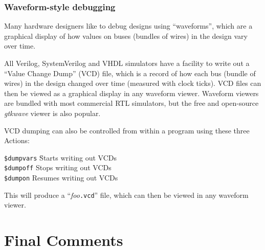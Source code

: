 
\begin{frame}[fragile]
\frametitle{Waveform-style debugging}

\footnotesize

Many hardware designers like to debug designs using ``waveforms'',
which are a graphical display of how values on buses (bundles of
wires) in the design vary over time.

\vxx

All Verilog, SystemVerilog and VHDL simulators have a facility to
write out a ``Value Change Dump'' (VCD) file, which is a record of how
each bus (bundle of wires) in the design changed over time (measured
with clock ticks).  VCD files can then be viewed as a graphical
display in any waveform viewer.  Waveform viewers are bundled with
most commercial RTL simulators, but the free and open-source
\emph{gtkwave} viewer is also popular.

\vxx

VCD dumping can also be controlled from within a {\BSV} program using
these three Actions:

\begin{tabbing}
\hmmmm \= {\tt \$dumpvars} \hmm \= Starts writing out VCDs \\
       \> {\tt \$dumpoff}       \> Stops  writing out VCDs \\
       \> {\tt \$dumpon}        \> Resumes writing out VCDs
\end{tabbing}

This will produce a ``\emph{foo}{\tt .vcd}'' file, which can then be viewed in
any waveform viewer.

\end{frame}


\section{Final Comments}

